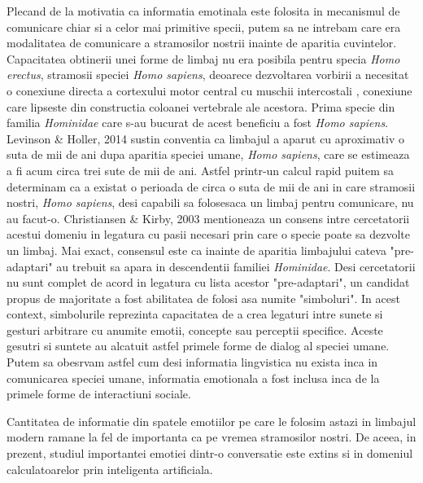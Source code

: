 \documentclass[a4paper,12pt]{book}
\begin{document}
				Plecand de la motivatia ca informatia emotinala este folosita in mecanismul de comunicare chiar si a celor mai primitive specii, putem sa ne intrebam care era modalitatea de comunicare a stramosilor nostrii inainte de aparitia cuvintelor. Capacitatea obtinerii unei forme de limbaj nu era posibila pentru specia \textit{Homo erectus}, stramosii speciei \textit{Homo sapiens}, deoarece dezvoltarea vorbirii a necesitat o conexiune directa a cortexului motor central cu muschii intercostali , conexiune care lipseste din constructia coloanei vertebrale ale acestora. Prima specie din familia \textit{Hominidae} care s-au bucurat de acest beneficiu a fost \textit{Homo sapiens}.  Levinson \& Holler, 2014 \cite{leviholler} sustin conventia ca limbajul a aparut cu aproximativ o suta de mii de ani dupa aparitia speciei umane, \textit{Homo sapiens}, care se estimeaza a fi acum circa trei sute de mii de ani. Astfel printr-un calcul rapid puitem sa determinam ca a existat o perioada de circa o suta de mii de ani in care stramosii nostri, \textit{Homo sapiens}, desi capabili sa folosesaca un limbaj pentru comunicare, nu au facut-o. Christiansen \& Kirby, 2003 \cite{chriskirbi} mentioneaza un consens intre cercetatorii acestui domeniu in legatura cu pasii necesari prin care o specie poate sa dezvolte un limbaj. Mai exact, consensul este ca inainte de aparitia limbajului cateva "pre-adaptari" au trebuit sa apara in descendentii familiei \textit{Hominidae}. Desi cercetatorii nu sunt complet de acord in legatura cu lista acestor "pre-adaptari", un candidat propus de majoritate a fost abilitatea de folosi asa numite "simboluri". In acest context, simbolurile reprezinta capacitatea de a crea legaturi intre sunete si gesturi arbitrare cu anumite emotii, concepte sau perceptii specifice. Aceste gesutri si suntete au alcatuit astfel primele forme de dialog al speciei umane. Putem sa obesrvam astfel cum desi informatia lingvistica nu exista inca in comunicarea speciei umane, informatia emotionala a fost inclusa inca de la primele forme de interactiuni sociale.\par 
				
				
				Cantitatea de informatie din spatele emotiilor pe care le folosim astazi in limbajul modern ramane la fel de importanta ca pe vremea stramosilor nostri. De aceea, in prezent, studiul importantei emotiei dintr-o conversatie este extins si in domeniul calculatoarelor prin inteligenta artificiala. \par	
\end{document}
